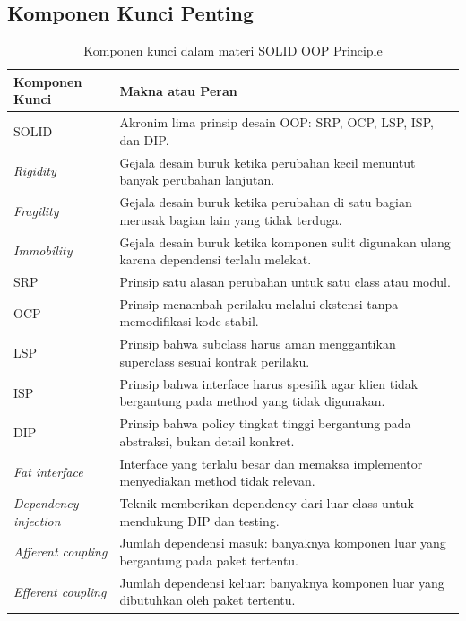 \subsection{Komponen Kunci Penting}

\begin{table}[H]
\centering
\begin{tabularx}{\textwidth}{|L{0.28\textwidth}|X|}
\hline
\textbf{Komponen Kunci} & \textbf{Makna atau Peran} \\
\hline
SOLID & Akronim lima prinsip desain OOP: SRP, OCP, LSP, ISP, dan DIP. \\
\hline
\textit{Rigidity} & Gejala desain buruk ketika perubahan kecil menuntut banyak perubahan lanjutan. \\
\hline
\textit{Fragility} & Gejala desain buruk ketika perubahan di satu bagian merusak bagian lain yang tidak terduga. \\
\hline
\textit{Immobility} & Gejala desain buruk ketika komponen sulit digunakan ulang karena dependensi terlalu melekat. \\
\hline
SRP & Prinsip satu alasan perubahan untuk satu class atau modul. \\
\hline
OCP & Prinsip menambah perilaku melalui ekstensi tanpa memodifikasi kode stabil. \\
\hline
LSP & Prinsip bahwa subclass harus aman menggantikan superclass sesuai kontrak perilaku. \\
\hline
ISP & Prinsip bahwa interface harus spesifik agar klien tidak bergantung pada method yang tidak digunakan. \\
\hline
DIP & Prinsip bahwa policy tingkat tinggi bergantung pada abstraksi, bukan detail konkret. \\
\hline
\textit{Fat interface} & Interface yang terlalu besar dan memaksa implementor menyediakan method tidak relevan. \\
\hline
\textit{Dependency injection} & Teknik memberikan dependency dari luar class untuk mendukung DIP dan testing. \\
\hline
\textit{Afferent coupling} & Jumlah dependensi masuk: banyaknya komponen luar yang bergantung pada paket tertentu. \\
\hline
\textit{Efferent coupling} & Jumlah dependensi keluar: banyaknya komponen luar yang dibutuhkan oleh paket tertentu. \\
\hline
\end{tabularx}
\caption{Komponen kunci dalam materi SOLID OOP Principle}
\label{tab:komponen-kunci-solid-oop-principle}
\end{table}

